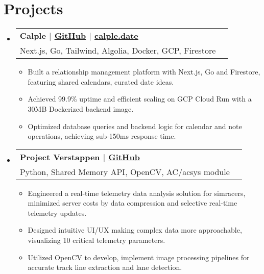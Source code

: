 \documentclass[letterpaper,11pt]{article}
\makeatletter
\newcommand{\resumeItem}[1]{
  \item{
    {#1}
  }
}
\newcommand{\resumeSubheading}[4]{
    \item
    \begin{tabular*}{0.985\textwidth}[t]{l@{\extracolsep{\fill}}r@{\hspace{-0.1in}}}
        {\textbf{#1}} & {#2} \\
        #3 &  #4 \\
    \end{tabular*}\vspace{-5pt}
}
\newcommand{\resumeSubHeadingListStart}{\begin{itemize}[leftmargin=0.00in, rightmargin=-0.2in, label={}]\vspace{3pt}}
\newcommand{\resumeSubHeadingListEnd}{\end{itemize}\vspace{-5pt}}
\newcommand{\resumeItemListStart}{\vspace{3pt}\begin{itemize}[leftmargin=0.15in, rightmargin=0.15in]}
\newcommand{\resumeItemListEnd}{\end{itemize}\vspace{-5pt}}
\makeatother
\begin{document}

\section{Projects}


\resumeSubHeadingListStart
\resumeSubheading
{\textbf{Calple} \textnormal{$|$ \href{https://github.com/juhun32/calple}{GitHub} $|$ \href{https://www.calple.date}{calple.date}}} {}
{{Next.js, Go, Tailwind, Algolia, Docker, GCP, Firestore}}{}
\resumeItemListStart
\resumeItem{Built a relationship management platform with Next.js, Go and Firestore, featuring shared calendars, curated date ideas.}
\resumeItem{Achieved 99.9\% uptime and efficient scaling on GCP Cloud Run with a 30MB Dockerized backend image.}
\resumeItem{Optimized database queries and backend logic for calendar and note operations, achieving sub-150ms response time.}
\resumeItemListEnd
\resumeSubHeadingListEnd

\resumeSubHeadingListStart
\resumeSubheading
{\textbf{Project Verstappen} \textnormal{$|$ \href{https://github.com/juhun32/project-verstappen}{GitHub}}} {}
{{Python, Shared Memory API, OpenCV, AC/acsys module}}{}
\resumeItemListStart
\resumeItem{Engineered a real-time telemetry data analysis solution for simracers, minimized server costs by data compression and selective real-time telemetry updates.}
\resumeItem{Designed intuitive UI/UX making complex data more approachable, visualizing 10 critical telemetry parameters.}
\resumeItem{Utilized OpenCV to develop, implement image processing pipelines for accurate track line extraction and lane detection.}
\resumeItemListEnd
\resumeSubHeadingListEnd
\end{document}
